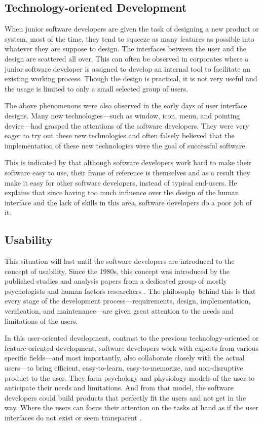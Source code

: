\documentclass[a4paper,titlepage]{article}
\begin{document}
\subsection{Technology-oriented Development}
When junior software developers are given the task of designing a new
product or system, most of the time, they tend to squeeze as many
features as possible into whatever they are suppose to design. The
interfaces between the user and the design are scattered all
over. This can often be observed in corporates where a junior software
developer is assigned to develop an internal tool to facilitate an
existing working process. Though the design is practical, it is not
very useful and the usage is limited to only a small selected group of
users.

The above phenomenons were also observed in the early days of user
interface designs. Many new technologies---such as window, icon, menu,
and pointing device---had grasped the attentions of the software
developers. They were very eager to try out these new technologies and
often falsely believed that the implementation of these new
technologies were the goal of successful software.

This is indicated by \citet{inmates:cooper} that although software
developers work hard to make their software easy to use, their frame
of reference is themselves and as a result they make it easy for other
software developers, instead of typical end-users. He explains that
since having too much influence over the design of the human interface
and the lack of skills in this area, software developers do a poor job
of it.

\subsection{Usability}
This situation will last until the software developers are introduced
to the concept of usability. Since the 1980s, this concept was
introduced by the published studies and analysis papers from a
dedicated group of mostly psychologists and human factors researchers
\citep{human:rubinstein, friendly:simpson, human:shneiderman,
  human:brown, software:dumas}. The philosophy behind this is that
every stage of the development process---requirements, design,
implementation, verification, and maintenance---are given great
attention to the needs and limitations of the users.

In this user-oriented development, contrast to the previous
technology-oriented or feature-oriented development, software
developers work with experts from various specific fields---and most
importantly, also collaborate closely with the actual users---to bring
efficient, easy-to-learn, easy-to-memorize, and non-disruptive product
to the user. They form psychology and physiology models of the user to
anticipate their needs and limitations. And from that model, the
software developers could build products that perfectly fit the users
and not get in the way. Where the users can focus their attention on
the tasks at hand as if the user interfaces do not exist or seem
transparent \citep{computer:weiser}.
\end{document}
